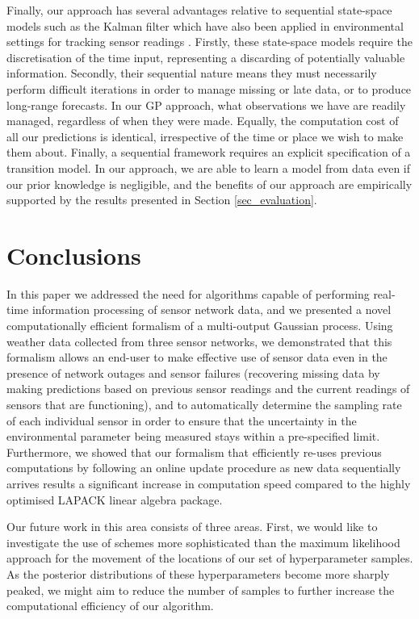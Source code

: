 \documentclass{acmsmall}
\begin{document}
Finally, our approach has several advantages relative to sequential state-space models such as the Kalman filter \cite{Girard,Jazwinski} which have also been applied in environmental settings for tracking sensor readings \cite{kalman_oceanography}. Firstly, these state-space models require the discretisation of the time input, representing a discarding of potentially valuable information. Secondly, their sequential nature means they must necessarily perform difficult iterations in order to manage missing or late data, or to produce long-range forecasts. In our GP approach, what observations we have are readily managed, regardless of when they were made. Equally, the computation cost of all our predictions is identical, irrespective of the time or place we wish to make them about. Finally, a sequential framework requires an explicit specification of a transition model. In our approach, we are able to learn a model from data even if our prior knowledge is negligible, and the benefits of our approach are empirically supported by the results presented in Section \ref{sec_evaluation}.

\section{Conclusions}\label{sec_conclusion}

\noindent In this paper we addressed the need for algorithms capable of performing real-time information processing of sensor network data, and we presented a novel computationally efficient formalism of a multi-output Gaussian process. Using weather data collected from three sensor networks, we demonstrated that this formalism allows an end-user to make effective use of sensor data even in the presence of network outages and sensor failures (recovering missing data by making predictions based on previous sensor readings and the current readings of sensors that are functioning), and to automatically determine the sampling rate of each individual sensor in order to ensure that the uncertainty in the environmental parameter being measured stays within a pre-specified limit. Furthermore, we showed that our formalism that efficiently re-uses previous computations by following an online update procedure as new data sequentially arrives results a significant increase in computation speed compared to the highly optimised LAPACK linear algebra package.

Our future work in this area consists of three areas. First, we would like to investigate the use of schemes more sophisticated than the maximum likelihood approach for the movement of the locations of our set of hyperparameter samples. As the posterior distributions of these hyperparameters become more sharply peaked, we might aim to reduce the number of samples to further increase the computational efficiency of our algorithm.
\end{document}
